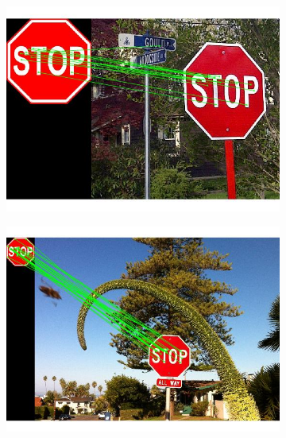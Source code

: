 \documentclass[a4paper]{iacas}
\begin{document}
\begin{figure}[!htbp]
	
	\begin{subfigure}[b]{0.32\textwidth}
		\includegraphics[width=\textwidth]{202.jpg}
		\caption{}
		\label{fig:202}
	\end{subfigure}
	\begin{subfigure}[b]{0.32\textwidth}
		\includegraphics[width=\textwidth]{203.jpg}
		\caption{}
		\label{fig:203}
	\end{subfigure}
	\begin{subfigure}[b]{0.32\textwidth}

\end{subfigure}
\end{figure}
\end{document}
